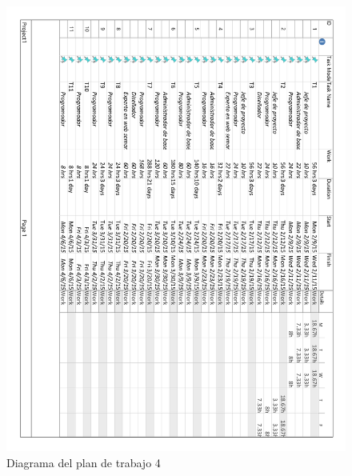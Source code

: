 \begin{figure}[!htp]
	\centering
	\includegraphics[page=4, scale=.8]{fig/work_plan_diagram}
	\caption{Diagrama del plan de trabajo 4}
\end{figure}

